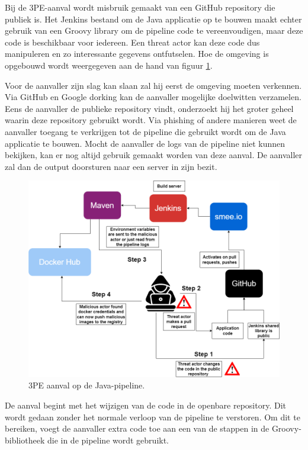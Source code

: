 Bij de 3PE-aanval wordt misbruik gemaakt van een GitHub repository die publiek is. Het Jenkins bestand om de Java applicatie op te bouwen maakt echter gebruik van een Groovy library om de pipeline code te vereenvoudigen, maar deze code is beschikbaar voor iedereen. Een threat actor kan deze code dus manipuleren en zo interessante gegevens ontfutselen. Hoe de omgeving is opgebouwd wordt weergegeven aan de hand van figuur \ref{fig:3PE-aanval}.
\clearpage

Voor de aanvaller zijn slag kan slaan zal hij eerst de omgeving moeten verkennen. Via GitHub en Google dorking kan de aanvaller mogelijke doelwitten verzamelen. Eens de aanvaller de publieke repository vindt, onderzoekt hij het groter geheel waarin deze repository gebruikt wordt. Via phishing of andere manieren weet de aanvaller toegang te verkrijgen tot de pipeline die gebruikt wordt om de Java applicatie te bouwen. Mocht de aanvaller de logs van de pipeline niet kunnen bekijken, kan er nog altijd gebruik gemaakt worden van deze aanval. De aanvaller zal dan de output doorsturen naar een server in zijn bezit. 
\newline

\begin{figure}[H]
  \includegraphics[scale=0.35]{graphics/Attack1.png}
\caption{\label{fig:3PE-aanval} 3PE aanval op de Java-pipeline.}
\end{figure}

De aanval begint met het wijzigen van de code in de openbare repository. Dit wordt gedaan zonder het normale verloop van de pipeline te verstoren. Om dit te bereiken, voegt de aanvaller extra code toe aan een van de stappen in de Groovy-bibliotheek die in de pipeline wordt gebruikt.
\newline

